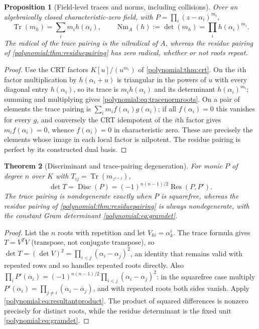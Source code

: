 \documentclass[11pt,letterpaper]{article}
\numberwithin{equation}{section}
\newtheorem{theorem}{Theorem}[section]
\newtheorem{proposition}[theorem]{Proposition}
\theoremstyle{definition}
\theoremstyle{remark}\newtheorem{remark}[theorem]{Remark}
\newcommand{\Res}{\operatorname{Res}}
\newcommand{\Disc}{\operatorname{Disc}}
\newcommand{\Tr}{\operatorname{Tr}}
\newcommand{\Nm}{\operatorname{Nm}}
\begin{document}
\begin{proposition}[Field-level traces and norms, including collisions]
\label{polynomial:prop:tracenormroots}
Over an algebraically closed characteristic-zero field, with
$P=\prod_i(z-\alpha_i)^{m_i}$,
\begin{equation}\label{polynomial:eq:tracenormroots}
 \Tr(m_h)=\sum_im_ih(\alpha_i),\qquad
 \Nm_A(h):=\det(m_h)=\prod_ih(\alpha_i)^{m_i} .
\end{equation}
The radical of the trace pairing is the nilradical of $A$, whereas the residue
pairing of \cref{polynomial:thm:residuepairing} has zero radical, whether or
not roots repeat.
\end{proposition}
\begin{proof}
Use the CRT factors $K[u]/(u^{m_i})$ of \cref{polynomial:thm:crt}. On the
$i$th factor multiplication by $h(\alpha_i+u)$ is triangular in the powers of
$u$ with every diagonal entry $h(\alpha_i)$, so its trace is $m_ih(\alpha_i)$
and its determinant $h(\alpha_i)^{m_i}$; summing and multiplying gives
\eqref{polynomial:eq:tracenormroots}. On a pair of elements the trace pairing
is $\sum_im_if(\alpha_i)g(\alpha_i)$; if all $f(\alpha_i)=0$ this vanishes for
every $g$, and conversely the CRT idempotent of the $i$th factor gives
$m_if(\alpha_i)=0$, whence $f(\alpha_i)=0$ in characteristic zero. These are
precisely the elements whose image in each local factor is nilpotent. The
residue pairing is perfect by its constructed dual basis.
\end{proof}

\begin{theorem}[Discriminant and trace-pairing degeneration]
\label{polynomial:thm:discriminant}
For monic $P$ of degree $n$ over $K$ with $T_{ij}=\Tr(m_{z^{i+j}})$,
\begin{equation}\label{polynomial:eq:tracedisc}
 \det T=\Disc(P)=(-1)^{n(n-1)/2}\Res(P,P') .
\end{equation}
The trace pairing is nondegenerate exactly when $P$ is squarefree, whereas the
residue pairing of \cref{polynomial:thm:residuepairing} is always
nondegenerate, with the constant Gram determinant
\eqref{polynomial:eq:gramdet}.
\end{theorem}
\begin{proof}
List the $n$ roots with repetition and let $V_{ki}=\alpha_k^i$. The trace
formula gives $T=V^TV$ (transpose, not conjugate transpose), so
$\det T=(\det V)^2=\prod_{i<j}(\alpha_i-\alpha_j)^2$, an identity that remains
valid with repeated rows and so handles repeated roots directly. Also
$\prod_iP'(\alpha_i)=(-1)^{n(n-1)/2}\prod_{i<j}(\alpha_i-\alpha_j)^2$: in the
squarefree case multiply $P'(\alpha_i)=\prod_{j\ne i}(\alpha_i-\alpha_j)$, and
with repeated roots both sides vanish. Apply
\eqref{polynomial:eq:resultantproduct}. The product of squared differences is
nonzero precisely for distinct roots, while the residue determinant is the
fixed unit \eqref{polynomial:eq:gramdet}.
\end{proof}
\end{document}
